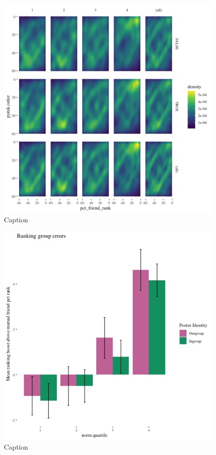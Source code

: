 \documentclass[12pt,letterpaper]{article}
\begin{document}
\begin{figure}[!h]
    \centering
    \includegraphics[scale=1]{Output/Graphs/Audit/Heatmaps/US PYMK pct friends by pymk rank by norm quartile - smooth.jpg}
    \caption{Caption}
    \label{fig:nf_time_pref_group}
\end{figure}

\begin{figure}[!h]
    \centering
    \includegraphics[scale=1]{Output/Graphs/Audit/Misranking relative to expectation/Mutual friends expectation/US PYMK by norm pref.jpg}
    \caption{Caption}
    \label{fig:pymk_time_pref_group}
\end{figure}
\end{document}
